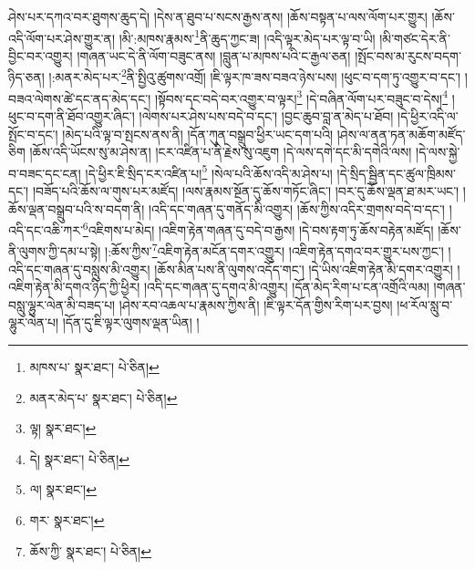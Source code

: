 ཤེས་པར་དཀའ་བར་ཐུགས་ཆུད་དེ། །དེས་ན་ཐུབ་པ་སངས་རྒྱས་ནས། །ཆོས་བསྟན་པ་ལས་ལོག་པར་གྱུར། །ཆོས་འདི་ལོག་པར་ཤེས་གྱུར་ན། །མི་:མཁས་རྣམས་\footnote{མཁས་པ་  སྣར་ཐང་།  པེ་ཅིན། }ནི་ཆུད་ཀྱང་ཟ། །འདི་ལྟར་མེད་པར་ལྟ་བ་ཡི། །མི་གཙང་དེར་ནི་བྱིང་བར་འགྱུར། །གཞན་ཡང་དེ་ནི་ལོག་བཟུང་ནས། །བླུན་པ་མཁས་པའི་ང་རྒྱལ་ཅན། །སྤོང་བས་མ་རུངས་བདག་ཉིད་ཅན། །:མནར་མེད་པར་\footnote{མནར་མེད་པ་  སྣར་ཐང་།  པེ་ཅིན། }ནི་སྤྱིའུ་ཚུགས་འགྲོ། །ཇི་ལྟར་ཁ་ཟས་བཟའ་ཉེས་པས། །ཕུང་བ་དག་ཏུ་འགྱུར་བ་དང་། །བཟའ་ལེགས་ཚེ་དང་ནད་མེད་དང་། །སྟོབས་དང་བདེ་བར་འགྱུར་བ་ལྟར།\footnote{ལྟ།  སྣར་ཐང་། } །དེ་བཞིན་ལོག་པར་བཟུང་བ་དེས།\footnote{དེ།  སྣར་ཐང་།  པེ་ཅིན། } །ཕུང་བ་དག་ནི་ཐོབ་འགྱུར་ཞིང་། །ལེགས་པར་ཤེས་པས་བདེ་བ་དང་། །བྱང་ཆུབ་བླ་ན་མེད་པ་ཐོབ། །དེ་ཕྱིར་འདི་ལ་སྤོང་བ་དང་། །མེད་པའི་ལྟ་བ་སྤངས་ནས་ནི། །དོན་ཀུན་བསྒྲུབ་ཕྱིར་ཡང་དག་པའི། །ཤེས་ལ་ནན་ཏན་མཆོག་མཛོད་ཅིག །ཆོས་འདི་ཡོངས་སུ་མ་ཤེས་ན། །ངར་འཛིན་པ་ནི་རྗེས་སུ་འཇུག །དེ་ལས་དགེ་དང་མི་དགེའི་ལས། །དེ་ལས་སྐྱེ་བ་བཟང་དང་ངན། །དེ་ཕྱིར་ཇི་སྲིད་ངར་འཛིན་པ།\footnote{ལ།  སྣར་ཐང་། } །སེལ་པའི་ཆོས་འདི་མ་ཤེས་པ། །དེ་སྲིད་སྦྱིན་དང་ཚུལ་ཁྲིམས་དང་། །བཟོད་པའི་ཆོས་ལ་གུས་པར་མཛོད། །ལས་རྣམས་སྔོན་དུ་ཆོས་གཏོང་ཞིང་། །བར་དུ་ཆོས་ལྡན་ཐ་མར་ཡང་། །ཆོས་ལྡན་བསྒྲུབ་པའི་ས་བདག་ནི། །འདི་དང་གཞན་དུ་གནོད་མི་འགྱུར། །ཆོས་ཀྱིས་འདིར་གྲགས་བདེ་བ་དང་། །འདི་དང་འཆི་ཀར་\footnote{གར་  སྣར་ཐང་། }འཇིགས་པ་མེད། །འཇིག་རྟེན་གཞན་དུ་བདེ་བ་རྒྱས། །དེ་བས་རྟག་ཏུ་ཆོས་བརྟེན་མཛོད། །ཆོས་ནི་ལུགས་ཀྱི་དམ་པ་སྟེ། །:ཆོས་ཀྱིས་\footnote{ཆོས་ཀྱི་  སྣར་ཐང་།  པེ་ཅིན། }འཇིག་རྟེན་མངོན་དགར་འགྱུར། །འཇིག་རྟེན་དགའ་བར་གྱུར་པས་ཀྱང་། །འདི་དང་གཞན་དུ་བསླུས་མི་འགྱུར། །ཆོས་མིན་པས་ནི་ལུགས་འདོད་གང་། །དེ་ཡིས་འཇིག་རྟེན་མི་དགར་འགྱུར། །འཇིག་རྟེན་མི་དགའ་ཉིད་ཀྱི་ཕྱིར། །འདི་དང་གཞན་དུ་དགའ་མི་འགྱུར། །དོན་མེད་རིག་པ་ངན་འགྲོའི་ལམ། །གཞན་བསླུ་ལྷུར་ལེན་མི་བཟད་པ། །ཤེས་རབ་འཆལ་པ་རྣམས་ཀྱིས་ནི། །ཇི་ལྟར་དོན་གྱིས་རིག་པར་བྱས། །ཕ་རོལ་སླུ་བ་ལྷུར་ལེན་པ། །དོན་དུ་ཇི་ལྟར་ལུགས་ལྡན་ཡིན། །
